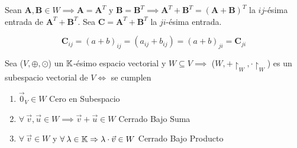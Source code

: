 \begin{proofexplanation}
    Sean $\textbf{A},\textbf{B} \in W \implies \textbf{A}={\textbf{A}}^{T} $ y $\textbf{B} = {\textbf{B}}^{T} \implies {\textbf{A}}^{T} + {\textbf{B}}^{T} = {(\textbf{A}+\textbf{B})}^{T}$ la $ij$-ésima entrada de ${\textbf{A}}^{T} + {\textbf{B}}^{T} $. Sea $\textbf{C}={\textbf{A}}^{T} + {\textbf{B}}^{T}$ la $ji$-ésima entrada.

    \begin{equation*}
        {\textbf{C}}_{ij} = {(a+b)}_{ij} = ({a}_{ij}+{b}_{ij}) = {(a+b)}_{ji} = {\textbf{C}}_{ji}
    \end{equation*}
\end{proofexplanation}

\begin{theorem} \label{teo3}
    Sea ($V, \oplus, \odot$) un $\mathbb{K}$-ésimo espacio vectorial y $W \subseteq V \implies$  ($W,+ \restriction_W,\cdot  {\restriction}_{W}$) es un subespacio vectorial de $V \iff$ se cumplen

    \begin{enumerate}[label={\roman*})]
        \item ${\vec{0}}_{V} \in W$ \hfill \textcolor{red!70!black}{Cero en Subespacio}
        \item $\forall \: \vec{v}, \vec{u} \in W \implies \vec{v} + \vec{u} \in W $ \hfill \textcolor{red!70!black}{Cerrado Bajo Suma}
        \item $\forall \: \vec{v} \in W $ y $\forall \: \lambda \in \mathbb{K} \Rightarrow \lambda \cdot \vec{v} \in W$ \hfill \textcolor{red!70!black}{Cerrado Bajo Producto}
    \end{enumerate}
\end{theorem}

